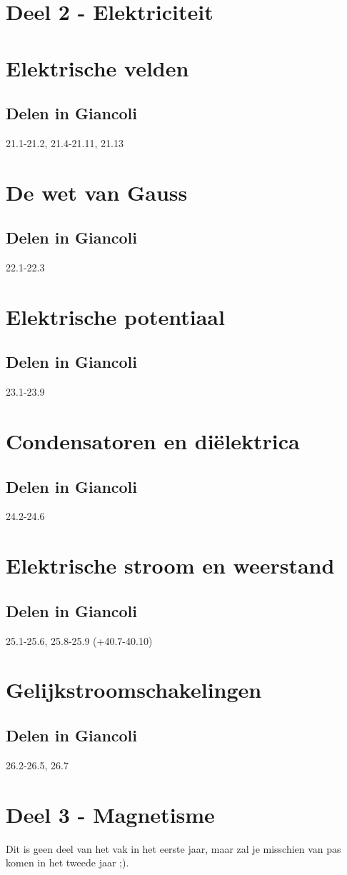 \documentclass[12pt,a4paper]{article}
\begin{document}
    \section{Deel 2 - Elektriciteit}


    \section{Elektrische velden}

    \subsection{Delen in Giancoli}
    21.1-21.2, 21.4-21.11, 21.13


    \section{De wet van Gauss}

    \subsection{Delen in Giancoli}
    22.1-22.3


    \section{Elektrische potentiaal}

    \subsection{Delen in Giancoli}
    23.1-23.9


    \section{Condensatoren en diëlektrica}

    \subsection{Delen in Giancoli}
    24.2-24.6


    \section{Elektrische stroom en weerstand}

    \subsection{Delen in Giancoli}
    25.1-25.6, 25.8-25.9 (+40.7-40.10)


    \section{Gelijkstroomschakelingen}

    \subsection{Delen in Giancoli}
    26.2-26.5, 26.7
    \newpage


    \section{Deel 3 - Magnetisme}
    Dit is geen deel van het vak in het eerste jaar, maar zal je misschien van pas komen in het tweede jaar ;).
\end{document}
